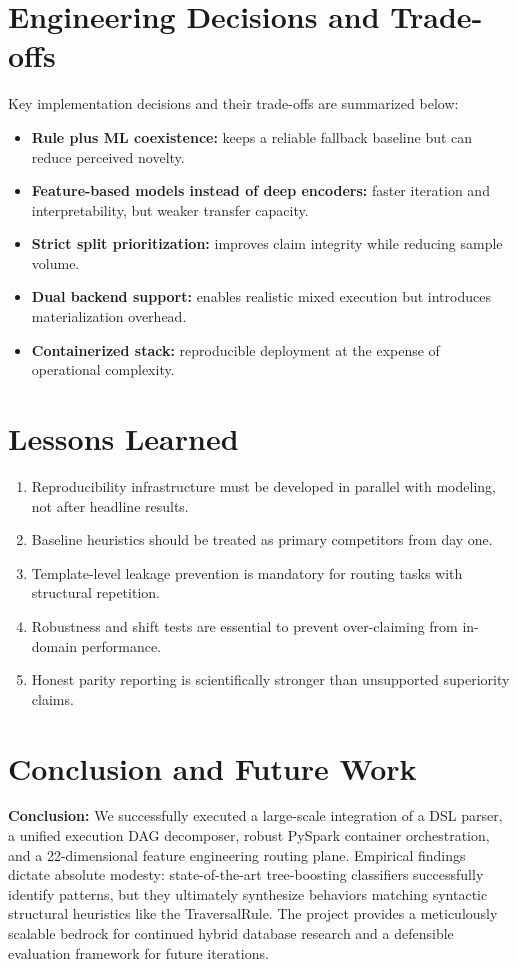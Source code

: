 \documentclass[conference]{IEEEtran}
\begin{document}
\section{Engineering Decisions and Trade-offs}
Key implementation decisions and their trade-offs are summarized below:
\begin{itemize}[leftmargin=*]
\item \textbf{Rule plus ML coexistence:} keeps a reliable fallback baseline but can reduce perceived novelty.
\item \textbf{Feature-based models instead of deep encoders:} faster iteration and interpretability, but weaker transfer capacity.
\item \textbf{Strict split prioritization:} improves claim integrity while reducing sample volume.
\item \textbf{Dual backend support:} enables realistic mixed execution but introduces materialization overhead.
\item \textbf{Containerized stack:} reproducible deployment at the expense of operational complexity.
\end{itemize}

\section{Lessons Learned}
\begin{enumerate}[leftmargin=*]
\item Reproducibility infrastructure must be developed in parallel with modeling, not after headline results.
\item Baseline heuristics should be treated as primary competitors from day one.
\item Template-level leakage prevention is mandatory for routing tasks with structural repetition.
\item Robustness and shift tests are essential to prevent over-claiming from in-domain performance.
\item Honest parity reporting is scientifically stronger than unsupported superiority claims.
\end{enumerate}

\section{Conclusion and Future Work}
\textbf{Conclusion:} We successfully executed a large-scale integration of a DSL parser, a unified execution DAG decomposer, robust PySpark container orchestration, and a 22-dimensional feature engineering routing plane. Empirical findings dictate absolute modesty: state-of-the-art tree-boosting classifiers successfully identify patterns, but they ultimately synthesize behaviors matching syntactic structural heuristics like the TraversalRule. The project provides a meticulously scalable bedrock for continued hybrid database research and a defensible evaluation framework for future iterations.
\end{document}
